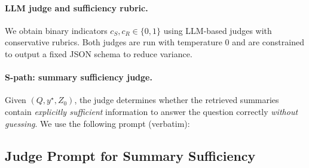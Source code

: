 \documentclass{article}
\theoremstyle{plain}
\theoremstyle{definition}
\theoremstyle{remark}
\begin{document}
\paragraph{LLM judge and sufficiency rubric.}
\label{app:router_judge}
We obtain binary indicators $c_S, c_R \in \{0,1\}$ using LLM-based judges with conservative rubrics.
Both judges are run with temperature $0$ and are constrained to output a fixed JSON schema to reduce variance.

\paragraph{S-path: summary sufficiency judge.}
Given $(Q, y^\star, Z_0)$, the judge determines whether the retrieved summaries contain \emph{explicitly sufficient} information to answer the question correctly \emph{without guessing}.
We use the following prompt (verbatim):

\subsection{Judge Prompt for Summary Sufficiency}
\label{app:llm_as_judge}
\end{document}
